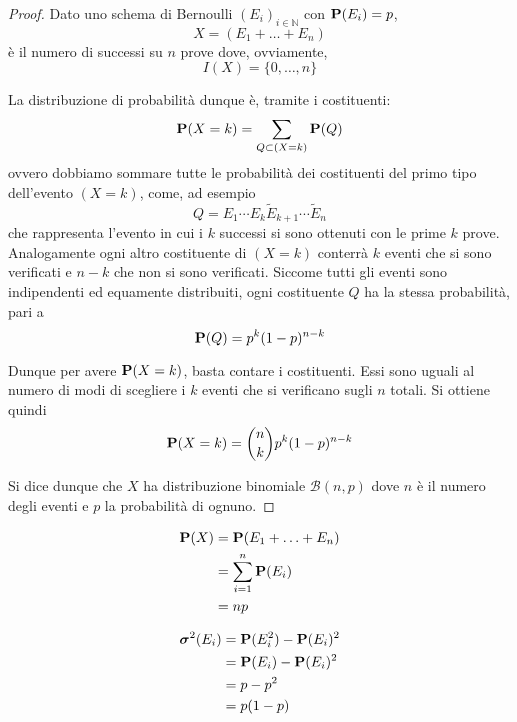 \begin{proof}
  Dato uno schema di Bernoulli \( (E_i)_{i \in \mathbb{N}} \) con \( \mathbf{P}(E_i) = p \),
  \[ X = (E_1 + \ldots + E_n) \]
  è il numero di successi su \( n \) prove dove, ovviamente,
  \[ I(X) = \{0, \ldots, n\} \]

  La distribuzione di probabilità dunque è, tramite i costituenti:
  \[ \mathbf{P}(X = k) = \sum_{Q \subset (X = k)} \mathbf{P}(Q) \]
  ovvero dobbiamo sommare tutte le probabilità dei costituenti del primo tipo dell'evento \( (X = k) \), come, ad esempio
  \[ Q = E_1 \cdots E_k \tilde{E}_{k+1} \cdots \tilde{E}_n \]
  che rappresenta l'evento in cui i \( k \) successi si sono ottenuti con le prime \( k \) prove.
  Analogamente ogni altro costituente di \( (X = k) \) conterrà \( k \) eventi che si sono verificati e \( n-k \) che non si sono verificati.
  Siccome tutti gli eventi sono indipendenti ed equamente distribuiti, ogni costituente \( Q \) ha la stessa probabilità, pari a
  \[ \mathbf{P}(Q) = p^k (1-p)^{n-k} \]

  Dunque per avere \( \mathbf{P}(X = k) \), basta contare i costituenti.
  Essi sono uguali al numero di modi di scegliere i \( k \) eventi che si verificano sugli \( n \) totali. Si ottiene quindi
  \[ \mathbf{P}(X = k) = \binom{n}{k} p^k (1-p)^{n-k} \]

  Si dice dunque che \( X \) ha distribuzione binomiale \( \mathcal{B}(n, p) \) dove \( n \) è il numero degli eventi e \( p \) la probabilità di ognuno.
\end{proof}

\begin{proposition}
  \begin{align*}
    \mathbf{P}(X) &= \mathbf{P}(E_1 + \ldots + E_n) \\
    &= \sum_{i=1}^n \mathbf{P}(E_i) \\
    &= np
  \end{align*}
\end{proposition}

\begin{proposition}
  \begin{align*}
    \boldsymbol\sigma^2(E_i) &= \mathbf{P}(E_i^2) - \mathbf{P}(E_i)^2 \\
    &= \mathbf{P}(E_i) - \mathbf{P}(E_i)^2 \\
    &= p - p^2 \\
    &= p (1 - p)
  \end{align*}
\end{proposition}

